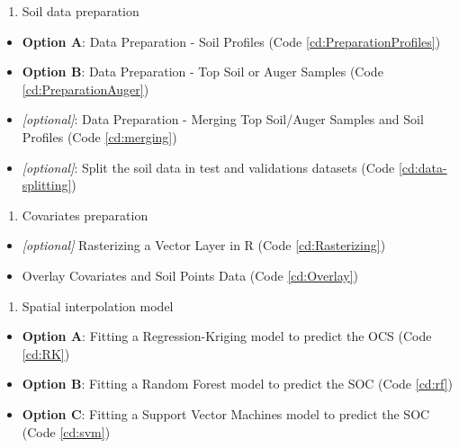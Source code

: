 \documentclass[10pt,b5paper,]{book}
\providecommand{\tightlist}{%
  \setlength{\itemsep}{0pt}\setlength{\parskip}{0pt}}
\theoremstyle{definition}
\theoremstyle{definition}
\theoremstyle{definition}
\theoremstyle{remark}
\begin{document}
\begin{enumerate}
\def\labelenumi{\arabic{enumi}.}
\tightlist
\item
  Soil data preparation
\end{enumerate}

\begin{itemize}
\tightlist
\item
  \textbf{Option A}: Data Preparation - Soil Profiles (Code
  \ref{cd:PreparationProfiles})
\item
  \textbf{Option B}: Data Preparation - Top Soil or Auger Samples (Code
  \ref{cd:PreparationAuger})
\item
  \emph{{[}optional{]}}: Data Preparation - Merging Top Soil/Auger
  Samples and Soil Profiles (Code \ref{cd:merging})
\item
  \emph{{[}optional{]}}: Split the soil data in test and validations
  datasets (Code \ref{cd:data-splitting})
\end{itemize}

\begin{enumerate}
\def\labelenumi{\arabic{enumi}.}
\setcounter{enumi}{1}
\tightlist
\item
  Covariates preparation
\end{enumerate}

\begin{itemize}
\tightlist
\item
  \emph{{[}optional{]}} Rasterizing a Vector Layer in R (Code
  \ref{cd:Rasterizing})
\item
  Overlay Covariates and Soil Points Data (Code \ref{cd:Overlay})
\end{itemize}

\begin{enumerate}
\def\labelenumi{\arabic{enumi}.}
\setcounter{enumi}{2}
\tightlist
\item
  Spatial interpolation model
\end{enumerate}

\begin{itemize}
\tightlist
\item
  \textbf{Option A}: Fitting a Regression-Kriging model to predict the
  OCS (Code \ref{cd:RK})
\item
  \textbf{Option B}: Fitting a Random Forest model to predict the SOC
  (Code \ref{cd:rf})
\item
  \textbf{Option C}: Fitting a Support Vector Machines model to predict
  the SOC (Code \ref{cd:svm})
\end{itemize}
\end{document}
